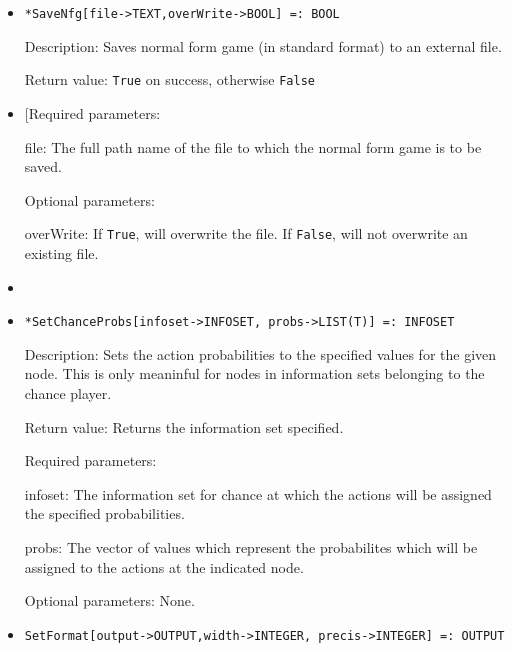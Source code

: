 \begin{itemize}
\item
\protect \large \begin{verbatim}
*SaveNfg[file->TEXT,overWrite->BOOL] =: BOOL
\end{verbatim}\normalsize

\bd
\item
[Description:] Saves normal form game (in standard format) to an
external file.  
\item
[Return value:] \verb+True+ on success, otherwise \verb+False+
\item

[Required parameters:

\bd
\item
[file:] The full path name of the file to which the normal form game
is to be saved. \ed

\item
[Optional parameters:]\hfil\null
\bd
\item
[overWrite:] If \verb+True+, will overwrite the file.  If \verb+False+, will
not overwrite an existing file.  
\ed
\ed

\item

\item
\protect \large \begin{verbatim} 
*SetChanceProbs[infoset->INFOSET, probs->LIST(T)] =: INFOSET
\end{verbatim}\normalsize

\bd
\item
[Description:] Sets the action probabilities to the specified values
for the given node.  This is only meaninful for nodes in information
sets belonging to the chance player.
\item
[Return value:] Returns the information set specified.
\item
[Required parameters:]\hfil\null
	
\bd
\item
[infoset:] The information set for chance at which the actions will be
assigned the specified probabilities.
\item
[probs:] The vector of values which represent the probabilites which
will be assigned to the actions at the indicated node.
\ed

\item
[Optional parameters:] None.
\ed

\item
\protect \large \begin{verbatim}
SetFormat[output->OUTPUT,width->INTEGER, precis->INTEGER] =: OUTPUT
\end{verbatim}\normalsize



\end{itemize}
